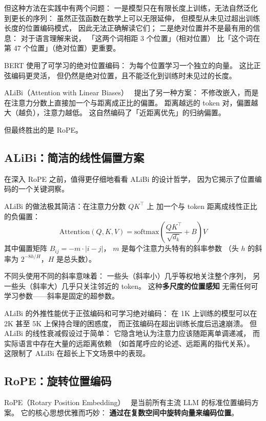 但这种方法在实践中有两个问题：
一是模型只在有限长度上训练，无法自然泛化到更长的序列：
虽然正弦函数在数学上可以无限延伸，
但模型从未见过超出训练长度的位置编码模式，
因此无法正确解读它们；
二是绝对位置并不是最有用的信息：
对于语言理解来说，
「这两个词相距 3 个位置」（相对位置）
比「这个词在第 47 个位置」（绝对位置）更重要。

BERT 使用了可学习的绝对位置编码：
为每个位置学习一个独立的向量。
这比正弦编码更灵活，
但仍然是绝对位置，且不能泛化到训练时未见过的长度。

ALiBi（Attention with Linear Biases）~\cite{press2022alibi}
提出了另一种方案：
不修改嵌入，而是在注意力分数上直接加一个与距离成正比的偏置。
距离越远的 token 对，偏置越大（越负），注意力越低。
这自然编码了「近距离优先」的归纳偏置。

但最终胜出的是 RoPE。

\subsection{ALiBi：简洁的线性偏置方案}

在深入 RoPE 之前，值得更仔细地看看 ALiBi 的设计哲学，
因为它揭示了位置编码的一个关键洞察。

ALiBi 的做法极其简洁：在注意力分数 $QK^\top$ 上
加一个与 token 距离成线性正比的负偏置：
\begin{equation}
  \mathrm{Attention}(Q, K, V) =
  \mathrm{softmax}\!\left(\frac{QK^\top}{\sqrt{d_k}} + B\right) V
\end{equation}
其中偏置矩阵 $B_{ij} = -m \cdot |i - j|$，
$m$ 是每个注意力头特有的斜率参数
（头 $h$ 的斜率为 $2^{-8h/H}$，$H$ 是总头数）。

不同头使用不同的斜率意味着：
一些头（斜率小）几乎等权地关注整个序列，
另一些头（斜率大）几乎只关注邻近的 token。
这种\textbf{多尺度的位置感知}
无需任何可学习参数——斜率是固定的超参数。

ALiBi 的外推性能优于正弦编码和可学习绝对编码：
在 1K 上训练的模型可以在 2K 甚至 5K 上保持合理的困惑度，
而正弦编码在超出训练长度后迅速崩溃。
但 ALiBi 的线性衰减假设过于简单：
它隐含地认为注意力应该随距离单调递减，
而实际语言中存在大量的远距离依赖
（如首尾呼应的论述、远距离的指代关系）。
这限制了 ALiBi 在超长上下文场景中的表现。

\subsection{RoPE：旋转位置编码}

RoPE（Rotary Position Embedding）~\cite{su2021rope}
是当前所有主流 LLM 的标准位置编码方案。
它的核心思想优雅而巧妙：
\textbf{通过在复数空间中旋转向量来编码位置}。

